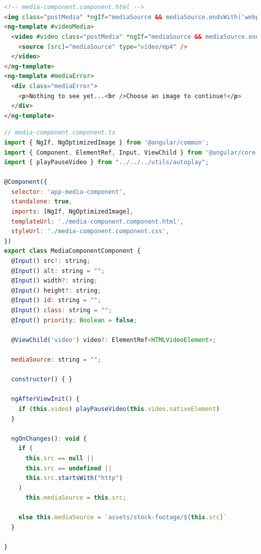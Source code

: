 \documentclass[a4paper, 10pt]{article}
\makeatletter
\renewcommand\lstlistoflistings{
  \section{\lstlistlistingname}
  \@starttoc{lol}%
}
\makeatother
\begin{document}
\pagebreak

\appendix

\lstlistoflistings

\begin{lstlisting}[caption=MediaComponent in Angular (Template), label={lst:Angular:MediaComponent:Template}, language=HTML]
<!-- media-component.component.html -->
<img class="postMedia" *ngIf="mediaSource && mediaSource.endsWith('webp'); else videoMedia" [ngSrc]="mediaSource" [alt]="alt" [width]="width?.endsWith('%') ? 600 : width" [height]="height || (width?.endsWith('%') ? 600 : width)" [id]="id" [class]="class" [sizes]="width!" [priority]="priority" />
<ng-template #videoMedia>
  <video #video class="postMedia" *ngIf="mediaSource && mediaSource.endsWith('mp4'); else mediaError" [attr.width]="width" controls controlslist="nodownload,nofullscreen,noremoteplayback" disablepictureinpicture loop [muted]="true" preload="metadata" >
    <source [src]="mediaSource" type="video/mp4" />
  </video>
</ng-template>
<ng-template #mediaError>
  <div class="mediaError">
    <p>Nothing to see yet...<br />Choose an image to continue!</p>
  </div>
</ng-template>

\end{lstlisting}

\begin{lstlisting}[caption=MediaComponent in Angular (Module), label={lst:Angular:MediaComponent:Module}, language=JavaScript]
// media-component.component.ts
import { NgIf, NgOptimizedImage } from '@angular/common';
import { Component, ElementRef, Input, ViewChild } from '@angular/core';
import { playPauseVideo } from "../../../utils/autoplay";

@Component({
  selector: 'app-media-component',
  standalone: true,
  imports: [NgIf, NgOptimizedImage],
  templateUrl: './media-component.component.html',
  styleUrl: './media-component.component.css',
})
export class MediaComponentComponent {
  @Input() src!: string;
  @Input() alt: string = "";
  @Input() width?: string;
  @Input() height?: string;
  @Input() id: string = "";
  @Input() class: string = "";
  @Input() priority: Boolean = false;

  @ViewChild('video') video?: ElementRef<HTMLVideoElement>;

  mediaSource: string = "";

  constructor() { }

  ngAfterViewInit() {
    if (this.video) playPauseVideo(this.video.nativeElement)
  }

  ngOnChanges(): void {
    if (
      this.src == null ||
      this.src == undefined ||
      this.src.startsWith("http")
    )
      this.mediaSource = this.src;

    else this.mediaSource = `assets/stock-footage/${this.src}`
  }

}
\end{lstlisting}
\end{document}
